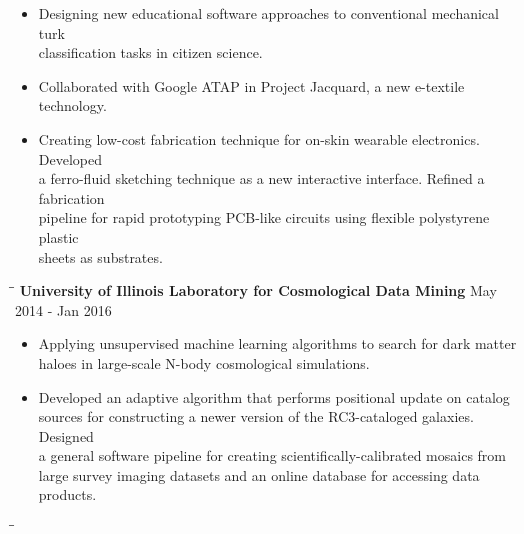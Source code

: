 \documentclass{res}
\begin{document}
\begin{resume}
     \begin{itemize}
	\item Designing new educational software approaches to conventional mechanical turk \\ classification tasks in citizen science. 
     \item Collaborated with Google ATAP in Project Jacquard, a new e-textile technology.  
     \item Creating low-cost fabrication technique for on-skin wearable electronics.  Developed \\a ferro-fluid sketching technique as a new interactive interface. Refined a fabrication \\pipeline for rapid prototyping PCB-like circuits using flexible polystyrene plastic \\sheets as substrates.
     \end{itemize}
     \vspace{-15pt}
   \begin{tabbing}
   \hspace{2.3in}\= \hspace{2.6in}\= \kill 
    {\bf  University of Illinois Laboratory for Cosmological Data Mining}  \> \>\hspace{7pt} May 2014 - Jan 2016
   \\
   \end{tabbing}\vspace{-20pt}    
     \begin{itemize}
     \item Applying unsupervised machine learning algorithms to search for dark matter \\haloes in  large-scale N-body cosmological simulations.
     \item  Developed an adaptive algorithm that performs positional update on catalog \\sources for constructing a newer version of the RC3-cataloged galaxies. Designed \\a general software pipeline for creating scientifically-calibrated mosaics from \\large survey imaging datasets and an online database for accessing data products.  
     \end{itemize}
       \vspace{-15pt}
\begin{tabbing}
   \hspace{2.3in}\= \hspace{2.6in}\= \kill 
   \vspace{-30pt}

\end{tabbing}
\end{resume}
\end{document}
